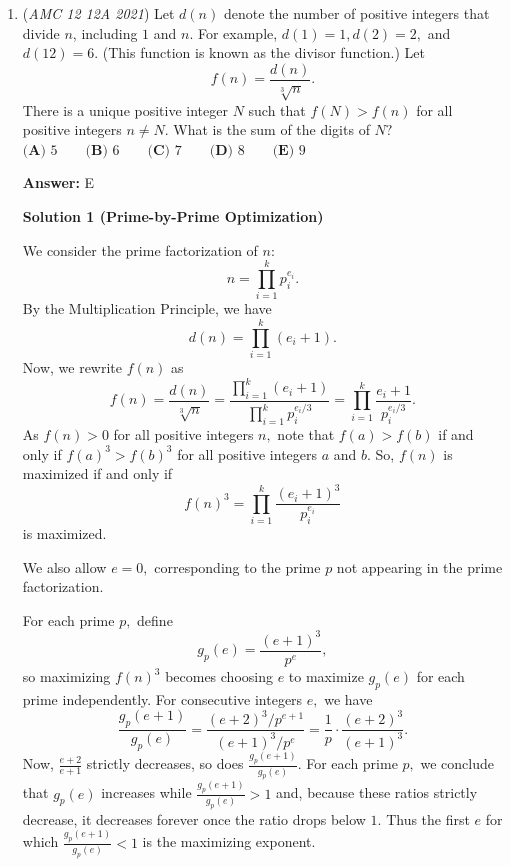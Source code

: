 \begin{enumerate}
 Since $QR\perp OS$, we have $PT\parallel OS$. Also, $PK\perp OS$ and $XT\perp OS$, so $PK\parallel XT$.

 Therefore $PKXT$ is a rectangle, giving

 
 \[PT=KX=\frac{33}{10}.\]

 Taking $QR$ as the base of $\triangle PQR$, its area is

 
 \[[PQR]=\frac12\cdot QR\cdot PT.\]

 Thus

 
 \[[PQR]=\frac12\cdot3\sqrt3\cdot\frac{33}{10}=\boxed{\frac{99\sqrt3}{20}}.\]

 Therefore $a=99$, $b=3$, and $c=20$, so

 
 \[\boxed{a+b+c=122}.\]

 The answer is $\boxed{\text{(D)}}$.

 This is invalid. ~r00tsOfUnity

 


	\item (\textit{AMC 12 12A 2021}) Let $d(n)$ denote the number of positive integers that divide $n$, including $1$ and $n$. For example, $d(1)=1,d(2)=2,$ and $d(12)=6$. (This function is known as the divisor function.) Let
 \[f(n)=\frac{d(n)}{\sqrt [3]n}.\]There is a unique positive integer $N$ such that $f(N)>f(n)$ for all positive integers $n\ne N$. What is the sum of the digits of $N?$
$\textbf{(A) }5 \qquad \textbf{(B) }6 \qquad \textbf{(C) }7 \qquad \textbf{(D) }8\qquad \textbf{(E) }9$

 \textbf{Answer: }E



\textbf{Solution 1 (Prime-by-Prime Optimization)}

We consider the prime factorization of $n:$ 
 \[n=\prod_{i=1}^{k}p_i^{e_i}.\] By the Multiplication Principle, we have 
 \[d(n)=\prod_{i=1}^{k}(e_i+1).\] Now, we rewrite $f(n)$ as 
 \[f(n)=\frac{d(n)}{\sqrt [3]n}=\frac{\prod_{i=1}^{k}(e_i+1)}{\prod_{i=1}^{k}p_i^{e_i/3}}=\prod_{i=1}^{k}\frac{e_i+1}{p_i^{{e_i}/3}}.\] As $f(n)>0$ for all positive integers $n,$ note that $f(a)>f(b)$ if and only if $f(a)^3>f(b)^3$ for all positive integers $a$ and $b.$ So, $f(n)$ is maximized if and only if 
 \[f(n)^3=\prod_{i=1}^{k}\frac{(e_i+1)^3}{p_i^{{e_i}}}\] is maximized.

 We also allow $e=0,$ corresponding to the prime $p$ not appearing in the prime factorization.

 For each prime $p,$ define 
 \[g_p(e)=\frac{(e+1)^3}{p^e},\] so maximizing $f(n)^3$ becomes choosing $e$ to maximize $g_p(e)$ for each prime independently. For consecutive integers $e,$ we have 
 \[\frac{g_p(e+1)}{g_p(e)}=\frac{(e+2)^3/p^{e+1}}{(e+1)^3/p^e}=\frac{1}{p}\cdot\frac{(e+2)^3}{(e+1)^3}.\] Now, $\frac{e+2}{e+1}$ strictly decreases, so does $\frac{g_p(e+1)}{g_p(e)}.$ For each prime $p,$ we conclude that $g_p(e)$ increases while $\frac{g_p(e+1)}{g_p(e)}>1$ and, because these ratios strictly decrease, it decreases forever once the ratio drops below $1.$ Thus the first $e$ for which $\frac{g_p(e+1)}{g_p(e)}<1$ is the maximizing exponent.


\end{enumerate}
